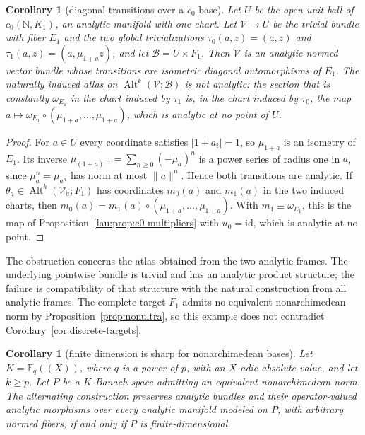 \documentclass[11pt]{amsart}
\newtheorem{corollary}[theorem]{Corollary}
\theoremstyle{definition}
\theoremstyle{remark}
\numberwithin{equation}{section}
\newcommand{\N}{\mathbb N}
\newcommand{\F}{\mathbb F}
\newcommand{\Alt}{\operatorname{Alt}}
\newcommand{\id}{\mathrm{id}}
\newcommand{\abs}[1]{\lvert #1\rvert}
\newcommand{\norm}[1]{\lVert #1\rVert}
\theoremstyle{plain}
\theoremstyle{definition}
\theoremstyle{plain}
\begin{document}
\begin{corollary}[diagonal transitions over a $c_0$ base]\label{lau:cor:diagonal-bundle}
Let $U$ be the open unit ball of $c_0(\N,K_1)$, an analytic manifold with one chart. Let $\mathcal V\to U$ be the
trivial bundle with fiber $E_1$ and the two global trivializations $\tau_0(a,z)=(a,z)$ and $\tau_1(a,z)=(a,\mu_{1+a}z)$,
and let $\mathcal B=U\times F_1$. Then $\mathcal V$ is an analytic normed vector bundle whose transitions are isometric
diagonal automorphisms of $E_1$. The naturally induced atlas on $\Alt^k(\mathcal V;\mathcal B)$ is not analytic: the section
that is constantly $\omega_{E_1}$ in the chart induced by $\tau_1$ is, in the chart induced by $\tau_0$, the map
$a\mapsto \omega_{E_1}\circ(\mu_{1+a},\dots,\mu_{1+a})$, which is analytic at no point of $U$.
\end{corollary}

\begin{proof}
For $a\in U$ every coordinate satisfies $\abs{1+a_i}=1$, so $\mu_{1+a}$ is an isometry of $E_1$. Its inverse
$\mu_{(1+a)^{-1}}=\sum_{n\ge0}(-\mu_a)^n$ is a power series of radius one in $a$, since $\mu_a^n=\mu_{a^n}$ has norm at most
$\norm a^n$. Hence both transitions are analytic. If $\theta_a\in\Alt^k(\mathcal V_a;F_1)$ has coordinates $m_0(a)$ and
$m_1(a)$ in the two induced charts, then $m_0(a)=m_1(a)\circ(\mu_{1+a},\dots,\mu_{1+a})$. With $m_1\equiv \omega_{E_1}$, this is the
map of Proposition~\ref{lau:prop:c0-multipliers} with $u_0=\id$, which is analytic at no point.
\end{proof}


The obstruction concerns the atlas obtained from the two analytic frames. The underlying pointwise bundle is trivial and has an analytic product structure; the failure is compatibility of that structure with the natural construction from all analytic frames. The complete target $F_1$ admits no equivalent nonarchimedean norm by Proposition~\ref{prop:nonultra}, so this example does not contradict Corollary~\ref{cor:discrete-targets}.

\begin{corollary}[finite dimension is sharp for nonarchimedean bases]\label{lau:cor:dichotomy}
Let $K=\F_q((X))$, where $q$ is a power of $p$, with an $X$\nobreakdash-adic absolute value, and let $k\ge p$. Let $P$ be a $K$\nobreakdash-Banach space admitting an equivalent nonarchimedean norm. The alternating construction preserves analytic bundles and their operator-valued analytic morphisms over every analytic manifold modeled on $P$, with arbitrary normed fibers, if and only if $P$ is finite-dimensional.
\end{corollary}
\end{document}
